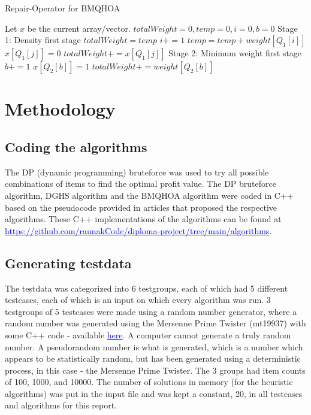 \documentclass[titlepage]{article}
\begin{document}
\begin{breakablealgorithm}
\caption{Repair-Operator for BMQHOA}\label{harmonicRepair}
    \begin{algorithmic}
        \State Let $x$ be the current array/vector.
        \State $totalWeight = 0, temp = 0, i = 0, b = 0$
        \State Stage 1: Density first stage
            \State $totalWeight = temp$
            \State $i += 1$
            \State $temp = temp + weight[Q_{1}[i]]$
        \EndWhile
            \State $x[Q_{1}[j]] = 0$
            \State $totalWeight += x[Q_{1}[j]]$
        \EndFor
        \State Stage 2: Minimum weight first stage
            \State $b += 1$
                    \State $x[Q_{2}[b]] = 1$
                \State $totalWeight += weight[Q_{2}[b]]$
            \EndIf
        \EndWhile
    \end{algorithmic}
\end{breakablealgorithm}

\newpage

\section{Methodology}

\subsection{Coding the algorithms}
The DP (dynamic programming) bruteforce was used to try all possible combinations of items to find the optimal profit value. The DP bruteforce algorithm, DGHS algorithm and the BMQHOA algorithm were coded in C++ based on the pseudocode provided in articles that proposed the respective algorithms. These C++ implementations of the algorithms can be found at \href{https://github.com/raunakCode/diploma-project/tree/main/algorithms}{\textcolor{blue}{https://github.com/raunakCode/diploma-project/tree/main/algorithms}}. 

\subsection{Generating testdata}
The testdata was categorized into 6 testgroups, each of which had 5 different testcases, each of which is an input on which every algorithm was run. 3 testgroups of 5 testcases were made using a random number generator, where a random number was generated using the Mersenne Prime Twister (mt19937) \cite{mersenne} with some C++ code - available \href{https://github.com/raunakCode/diploma-project/blob/main/testing/gen.cpp}{\textcolor{blue}{here}}. A computer cannot generate a truly random number. A pseudorandom number is what is generated, which is a number which appears to be statistically random, but has been generated using a deterministic process, in this case - the Mersenne Prime Twister. The 3 groups had item counts of 100, 1000, and 10000. The number of solutions in memory (for the heuristic algorithms) was put in the input file and was kept a constant, 20, in all testcases and algorithms for this report. 
\end{document}
